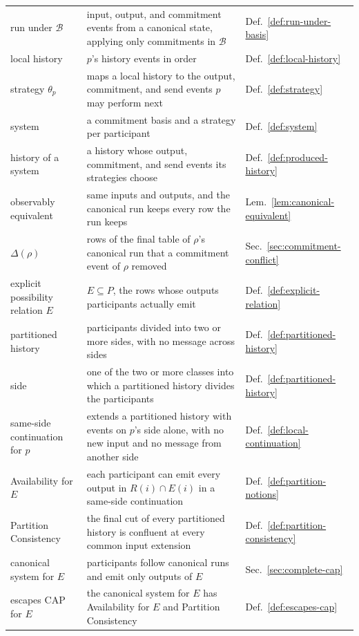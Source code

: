 \documentclass[sigconf]{cidr-2027}
\theoremstyle{remark}
\newcommand{\commitment}{commitment\xspace}
\newcommand{\commitments}{commitments\xspace}
\newcommand{\indesc}{input extension\xspace} %
\begin{document}
{\begin{tabular}{@{}>{\raggedright\arraybackslash}p{}>{\raggedright\arraybackslash}p{}>{\raggedright\arraybackslash}p{}@{}}
  run under $\mathcal B$ & input, output, and \commitment events from a canonical state, applying only \commitments in $\mathcal B$ & Def.~\ref{def:run-under-basis}\\
  local history & $p$'s history events in order & Def.~\ref{def:local-history}\\
  strategy $\theta_p$ & maps a local history to the output, \commitment, and send events $p$ may perform next & Def.~\ref{def:strategy}\\
  system & a \commitment basis and a strategy per participant & Def.~\ref{def:system}\\
  history of a system & a history whose output, \commitment, and send events its strategies choose & Def.~\ref{def:produced-history}\\
  observably equivalent & same inputs and outputs, and the canonical run keeps every row the run keeps & Lem.~\ref{lem:canonical-equivalent}\\
  $\Delta(\rho)$ & rows of the final table of $\rho$'s canonical run that a \commitment event of $\rho$ removed & Sec.~\ref{sec:commitment-conflict}\\
  explicit possibility relation $E$ & $E\subseteq P$, the rows whose outputs participants actually emit & Def.~\ref{def:explicit-relation}\\
  partitioned history & participants divided into two or more sides, with no message across sides & Def.~\ref{def:partitioned-history}\\
  side & one of the two or more classes into which a partitioned history divides the participants & Def.~\ref{def:partitioned-history}\\
  same-side continuation for $p$ & extends a partitioned history with events on $p$'s side alone, with no new input and no message from another side & Def.~\ref{def:local-continuation}\\
  Availability for $E$ & each participant can emit every output in $R(i)\cap E(i)$ in a same-side continuation & Def.~\ref{def:partition-notions}\\
  Partition Consistency & the final cut of every partitioned history is confluent at every common \indesc & Def.~\ref{def:partition-consistency}\\
  canonical system for $E$ & participants follow canonical runs and emit only outputs of $E$ & Sec.~\ref{sec:complete-cap}\\
  escapes CAP for $E$ & the canonical system for $E$ has Availability for $E$ and Partition Consistency & Def.~\ref{def:escapes-cap}\\

\end{tabular}}
\end{document}
